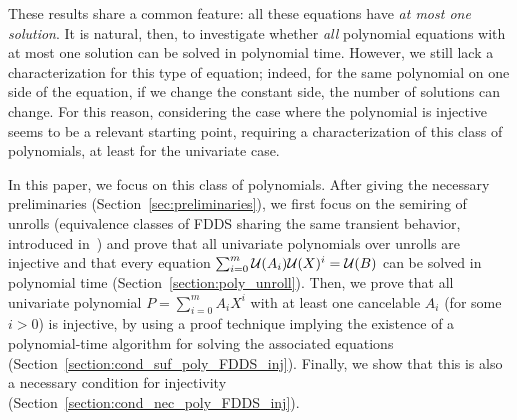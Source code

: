 These results share a common feature: all these equations have \emph{at most one solution}. 
It is natural, then, to investigate whether \emph{all} polynomial equations with at most one solution can be solved in polynomial time. 
However, we still lack a characterization for this type of equation; indeed, for the same polynomial on one side of the equation, if we change the constant side, the number of solutions can change.
For this reason, considering the case where the polynomial is injective seems to be a relevant starting point, requiring a characterization of this class of polynomials, at least for the univariate case.

In this paper, we focus on this class of polynomials. 
After giving the necessary preliminaries (Section~\ref{sec:preliminaries}), we first focus on the semiring of unrolls (equivalence classes of FDDS sharing the same transient behavior, introduced in~\cite{article_arbre}) and prove that all univariate polynomials over unrolls are injective and that every equation $\sum_{i=0}^{m} \mathcal{U}(A_i) \mathcal{U}(X)^i = \mathcal{U}(B)$ can be solved in polynomial time (Section~\ref{section:poly_unroll}).
Then, we prove that all univariate polynomial $P = \sum_{i=0}^{m} A_i X^i$ with at least one cancelable $A_i$ (for some $i > 0$) is injective, by using a proof technique implying the existence of a polynomial-time algorithm for solving the associated equations (Section~\ref{section:cond_suf_poly_FDDS_inj}).
Finally, we show that this is also a necessary condition for injectivity (Section~\ref{section:cond_nec_poly_FDDS_inj}).

